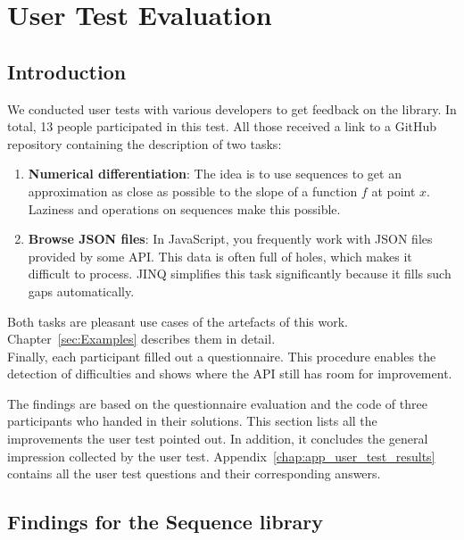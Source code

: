 \section{User Test Evaluation} %
\label{sec:User Test Evaluation}
\subsection{Introduction} %
\label{sub:Introduction}
We conducted user tests with various developers to get feedback on the library.
In total, 13 people participated in this test. All those received a link to a
GitHub repository containing the description of two tasks:
\begin{enumerate}
\item \textbf{Numerical differentiation}: The idea is to use sequences to get
  an approximation as close as possible to the slope of a function $f$ at point
  $x$. Laziness and operations on sequences make this possible.
\item \textbf{Browse JSON files}: In JavaScript, you frequently work with JSON
  files provided by some API. This data is often full of holes, which makes it
  difficult to process. JINQ simplifies this task significantly because it
  fills such gaps automatically. 
\end{enumerate}
Both tasks are pleasant use cases of the artefacts of this work.
Chapter~\ref{sec:Examples} describes them in detail.\\
Finally, each participant filled out a questionnaire. This procedure enables
the detection of difficulties and shows where the API still has room for
improvement. 

The findings are based on the questionnaire evaluation and the code of three
participants who handed in their solutions. This section lists all the
improvements the user test pointed out. In addition, it concludes the general
impression collected by the user test.
Appendix~\ref{chap:app_user_test_results} contains all the user test questions
and their corresponding answers.

\subsection{Findings for the Sequence library} %
\label{sub:Findings for the sequence library}

